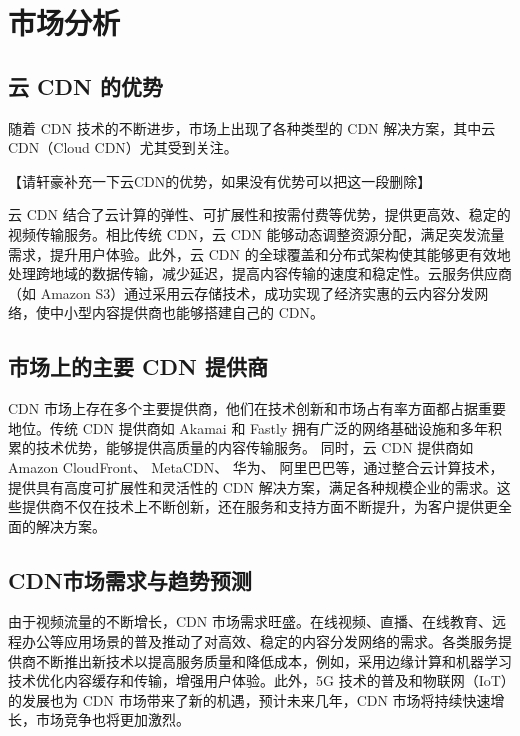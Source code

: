 \section{市场分析}

\subsection{云 CDN 的优势}

随着 CDN 技术的不断进步，市场上出现了各种类型的 CDN 解决方案，其中云 CDN（Cloud CDN）尤其受到关注。


【请轩豪补充一下云CDN的优势，如果没有优势可以把这一段删除】

云 CDN 结合了云计算的弹性、可扩展性和按需付费等优势，提供更高效、稳定的视频传输服务\cite{Sun2024}。相比传统 CDN，云 CDN 能够动态调整资源分配，满足突发流量需求，提升用户体验。此外，云 CDN 的全球覆盖和分布式架构使其能够更有效地处理跨地域的数据传输，减少延迟，提高内容传输的速度和稳定性。云服务供应商（如 Amazon S3）通过采用云存储技术，成功实现了经济实惠的云内容分发网络，使中小型内容提供商也能够搭建自己的 CDN\cite{Sun2024}。

\subsection{市场上的主要 CDN 提供商}

CDN 市场上存在多个主要提供商，他们在技术创新和市场占有率方面都占据重要地位。传统 CDN 提供商如 Akamai\cite{Optimize96:online}
 和 Fastly\cite{ContentD34:online} 拥有广泛的网络基础设施和多年积累的技术优势，能够提供高质量的内容传输服务。
 同时，云 CDN 提供商如 Amazon CloudFront\cite{Amazon:online}、
 MetaCDN\cite{CDNbyMet98:online}、
 华为\cite{HuaweiCl37:online}、
 阿里巴巴等\cite{CDNApsar88:online}，通过整合云计算技术，提供具有高度可扩展性和灵活性的 CDN 解决方案，满足各种规模企业的需求\cite{ghabashnehExploringInterplayCDN2020}\cite{Sun2024}。这些提供商不仅在技术上不断创新，还在服务和支持方面不断提升，为客户提供更全面的解决方案。

\subsection{CDN市场需求与趋势预测}

由于视频流量的不断增长，CDN 市场需求旺盛。在线视频、直播、在线教育、远程办公等应用场景的普及推动了对高效、稳定的内容分发网络的需求。各类服务提供商不断推出新技术以提高服务质量和降低成本，例如，采用边缘计算和机器学习技术优化内容缓存和传输，增强用户体验。此外，5G 技术的普及和物联网（IoT）的发展也为 CDN 市场带来了新的机遇，预计未来几年，CDN 市场将持续快速增长，市场竞争也将更加激烈。

